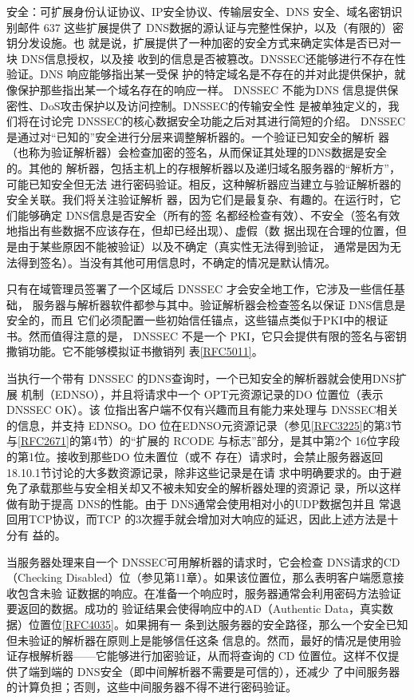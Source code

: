 安全：可扩展身份认证协议、IP安全协议、传输层安全、DNS 安全、域名密钥识别邮件 637
这些扩展提供了 DNS数据的源认证与完整性保护，以及（有限的）密钥分发设施。也
就是说，扩展提供了一种加密的安全方式来确定实体是否已对一块 DNS信息授权，以及接
收到的信息是否被篡改。DNSSEC还能够进行不存在性验证。DNS 响应能够指出某一受保
护的特定域名是不存在的并对此提供保护，就像保护那些指出某一个域名存在的响应一样。
DNSSEC 不能为DNS 信息提供保密性、DoS攻击保护以及访问控制。DNSSEC的传输安全性
是被单独定义的，我们将在讨论完 DNSSEC的核心数据安全功能之后对其进行简短的介绍。
DNSSEC是通过对“已知的”安全进行分层来调整解析器的。一个验证已知安全的解析
器（也称为验证解析器）会检查加密的签名，从而保证其处理的DNS数据是安全的。其他的
解析器，包括主机上的存根解析器以及递归域名服务器的“解析方”，可能已知安全但无法
进行密码验证。相反，这种解析器应当建立与验证解析器的安全关联。我们将关注验证解析
器，因为它们是最复杂、有趣的。在运行时，它们能够确定 DNS信息是否安全（所有的签
名都经检查有效）、不安全（签名有效地指出有些数据不应该存在，但却已经出现）、虚假（数
据出现在合理的位置，但是由于某些原因不能被验证）以及不确定（真实性无法得到验证，
通常是因为无法得到签名）。当没有其他可用信息时，不确定的情况是默认情况。

只有在域管理员签署了一个区域后 DNSSEC 才会安全地工作，它涉及一些信任基础，
服务器与解析器软件都参与其中。验证解析器会检查签名以保证 DNS信息是安全的，而且
它们必须配置一些初始信任锚点，这些锚点类似于PKI中的根证书。然而值得注意的是，
DNSSEC 不是一个 PKI，它只会提供有限的签名与密钥撒销功能。它不能够模拟证书撤销列
表\href{https://www.rfc-editor.org/rfc/rfc5011}{[RFC5011]}。

当执行一个带有 DNSSEC 的DNS查询时，一个已知安全的解析器就会使用DNS扩展
机制（EDNSO），并且将请求中一个 OPT元资源记录的DO 位置位（表示 DNSSEC OK）。该
位指出客户端不仅有兴趣而且有能力来处理与 DNSSEC相关的信息，并支持 EDNSO。DO
位在EDNSO元资源记录（参见\href{https://www.rfc-editor.org/rfc/rfc3225}{[RFC3225]}的第3节与\href{https://www.rfc-editor.org/rfc/rfc2671}{[RFC2671]}的第4节）的“扩展的
RCODE 与标志”部分，是其中第2个 16位字段的第1位。接收到那些DO 位未置位（或不
存在）请求时，会禁止服务器返回18.10.1节讨论的大多数资源记录，除非这些记录是在请
求中明确要求的。由于避免了承载那些与安全相关却又不被未知安全的解析器处理的资源记
录，所以这样做有助于提高 DNS的性能。由于 DNS通常会使用相对小的UDP数据包并且
常退回用TCP协议，而TCP 的3次握手就会增加对大响应的延迟，因此上述方法是十分有
益的。

当服务器处理来自一个 DNSSEC可用解析器的请求时，它会检查 DNS请求的CD
（Checking Disabled）位（参见第11章）。如果该位置位，那么表明客户端愿意接收包含未验
证数据的响应。在准备一个响应时，服务器通常会利用密码方法验证要返回的数据。成功的
验证结果会使得响应中的AD（Authentic Data，真实数据）位置位\href{https://www.rfc-editor.org/rfc/rfc4035}{[RFC4035]}。如果拥有一
条到达服务器的安全路径，那么一个安全已知但未验证的解析器在原则上是能够信任这条
信息的。然而，最好的情况是使用验证存根解析器——它能够进行加密验证，从而将查询的
CD 位置位。这样不仅提供了端到端的 DNS安全（即中间解析器不需要是可信的），还减少
了中间服务器的计算负担；否则，这些中间服务器不得不进行密码验证。

